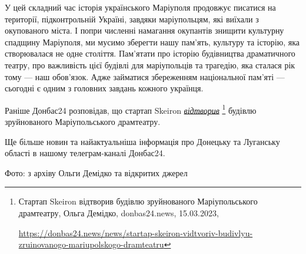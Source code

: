 
У цей складний час історія українського Маріуполя продовжує писатися на
території, підконтрольній Україні, завдяки маріупольцям, які виїхали з
окупованого міста. І попри численні намагання окупантів знищити культурну
спадщину Маріуполя, ми мусимо зберегти нашу пам'ять, культуру та історію, яка
створювалася не одне століття. Пам'ятати про історію будівництва драматичного
театру, про важливість цієї будівлі для маріупольців та трагедію, яка сталася
рік тому — наш обов'язок. Адже займатися збереженням національної пам'яті —
сьогодні є одним з головних завдань кожного українця.

Раніше Донбас24 розповідав, що стартап Skeiron \href{https://donbas24.news/news/startap-skeiron-vidtvoriv-budivlyu-zruinovanogo-mariupolskogo-dramteatru}{\emph{відтворив}}%
\footnote{Стартап Skeiron відтворив будівлю зруйнованого Маріупольського драмтеатру, Ольга Демідко, donbas24.news, 15.03.2023, \par%
\url{https://donbas24.news/news/startap-skeiron-vidtvoriv-budivlyu-zruinovanogo-mariupolskogo-dramteatru}%
} будівлю зруйнованого Маріупольського драмтеатру.

Ще більше новин та найактуальніша інформація про Донецьку та Луганську області
в нашому телеграм-каналі Донбас24.

Фото: з архіву Ольги Демідко та відкритих джерел

